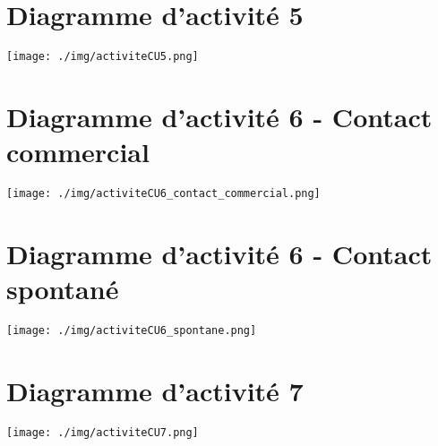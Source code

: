 \section{Diagramme d'activité 5}
\texttt{[image: ./img/activiteCU5.png]}

\section{Diagramme d'activité 6 - Contact commercial}
\texttt{[image: ./img/activiteCU6\_contact\_commercial.png]}

\section{Diagramme d'activité 6 - Contact spontané}
\texttt{[image: ./img/activiteCU6\_spontane.png]}

\section{Diagramme d'activité 7}
\texttt{[image: ./img/activiteCU7.png]}
